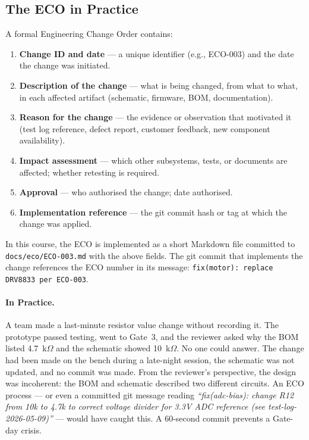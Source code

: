 \subsection{The ECO in Practice}
\label{subsec:ch13-eco-practice}

A formal Engineering Change Order contains:
\begin{enumerate}
  \item \textbf{Change ID and date} --- a unique identifier (e.g., ECO-003) and the date
        the change was initiated.
  \item \textbf{Description of the change} --- what is being changed, from what to what,
        in each affected artifact (schematic, firmware, BOM, documentation).
  \item \textbf{Reason for the change} --- the evidence or observation that motivated it
        (test log reference, defect report, customer feedback, new component availability).
  \item \textbf{Impact assessment} --- which other subsystems, tests, or documents are
        affected; whether retesting is required.
  \item \textbf{Approval} --- who authorised the change; date authorised.
  \item \textbf{Implementation reference} --- the git commit hash or tag at which the
        change was applied.
\end{enumerate}

In this course, the ECO is implemented as a short Markdown file committed to
\texttt{docs/eco/ECO-003.md} with the above fields.
The git commit that implements the change references the ECO number in its message:
\texttt{fix(motor): replace DRV8833 per ECO-003}.

\paragraph{In Practice.}
A team made a last-minute resistor value change without recording it.
The prototype passed testing, went to Gate~3, and the reviewer asked why the BOM listed
4.7~k$\Omega$ and the schematic showed 10~k$\Omega$.
No one could answer.
The change had been made on the bench during a late-night session, the schematic was not
updated, and no commit was made.
From the reviewer's perspective, the design was incoherent: the BOM and schematic described
two different circuits.
An ECO process --- or even a committed git message reading \emph{``fix(adc-bias): change
R12 from 10k to 4.7k to correct voltage divider for 3.3V ADC reference (see
test-log-2026-05-09)''} --- would have caught this.
A 60-second commit prevents a Gate-day crisis.

